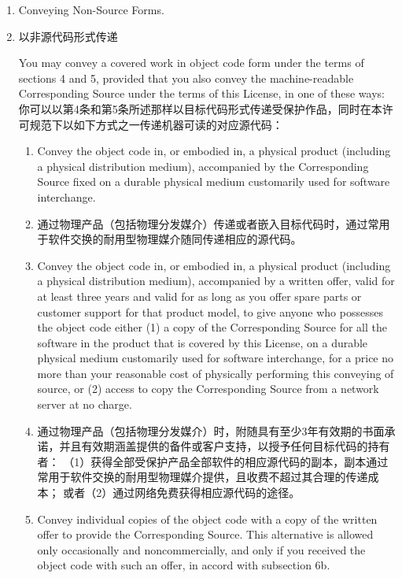 \documentclass[11pt]{article}
\begin{document}
\begin{enumerate}
\item Conveying Non-Source Forms.
\item 以非源代码形式传递

You may convey a covered work in object code form under the terms
of sections 4 and 5, provided that you also convey the
machine-readable Corresponding Source under the terms of this License,
in one of these ways:
你可以以第4条和第5条所述那样以目标代码形式传递受保护作品，同时在本许可规范下以如下方式之一传递机器可读的对应源代码：

  \begin{enumerate}
  \item Convey the object code in, or embodied in, a physical product
  (including a physical distribution medium), accompanied by the
  Corresponding Source fixed on a durable physical medium
  customarily used for software interchange.
  \item 通过物理产品（包括物理分发媒介）传递或者嵌入目标代码时，通过常用于软件交换的耐用型物理媒介随同传递相应的源代码。

  \item Convey the object code in, or embodied in, a physical product
  (including a physical distribution medium), accompanied by a
  written offer, valid for at least three years and valid for as
  long as you offer spare parts or customer support for that product
  model, to give anyone who possesses the object code either (1) a
  copy of the Corresponding Source for all the software in the
  product that is covered by this License, on a durable physical
  medium customarily used for software interchange, for a price no
  more than your reasonable cost of physically performing this
  conveying of source, or (2) access to copy the
  Corresponding Source from a network server at no charge.

  \item 通过物理产品（包括物理分发媒介）时，附随具有至少3年有效期的书面承诺，并且有效期涵盖提供的备件或客户支持，以授予任何目标代码的持有者：
  （1）获得全部受保护产品全部软件的相应源代码的副本，副本通过常用于软件交换的耐用型物理媒介提供，且收费不超过其合理的传递成本；
  或者（2）通过网络免费获得相应源代码的途径。

  \item Convey individual copies of the object code with a copy of the
  written offer to provide the Corresponding Source.  This
  alternative is allowed only occasionally and noncommercially, and
  only if you received the object code with such an offer, in accord
  with subsection 6b.
  

\end{enumerate}
\end{enumerate}
\end{document}
